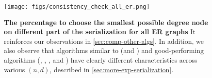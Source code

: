 \begin{figure}
    \centering
    \texttt{[image: figs/consistency\_check\_all\_er.png]}
    \caption{\textbf{The percentage to choose the smallest possible degree node on different part of the serialization for all ER graphs} It reinforces our observations in \cref{sec:comp-other-algs}. In addition, we also observe that algorithms similar to \deggreedy (\deggreedy and \gflownets) and good-performing algorithms (\onlinemis, \redumis, \isco, and \lwd) have clearly different characteristics across various $(n,d)$, described in \cref{sec:more-exp-serialization}.}
    \label{fig:serial-er}
\end{figure}